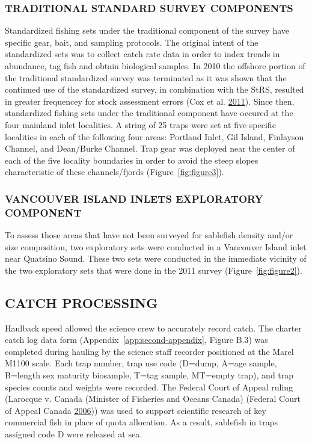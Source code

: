\documentclass[12pt]{article}\usepackage[]{graphicx}\usepackage[]{color}
\begin{document}
\hypertarget{traditional-standard-survey-components}{%
\subsubsection{TRADITIONAL STANDARD SURVEY COMPONENTS}\label{traditional-standard-survey-components}}

Standardized fishing sets under the traditional component of the survey have specific gear, bait, and sampling protocols. The original intent of the standardized sets was to collect catch rate data in order to index trends in abundance, tag fish and obtain biological samples. In 2010 the offshore portion of the traditional standardized survey was terminated as it was shown that the continued use of the standardized survey, in combination with the StRS, resulted in greater frequencey for stock assessment errors (Cox et al. \protect\hyperlink{ref-Cox2011}{2011}). Since then, standardized fishing sets under the traditional component have occured at the four mainland inlet localities. A string of 25 traps were set at five specific localities in each of the following four areas: Portland Inlet, Gil Island, Finlayson Channel, and Dean/Burke Channel. Trap gear was deployed near the center of each of the five locality boundaries in order to avoid the steep slopes characteristic of these channels/fjords (Figure~\ref{fig:figure3}).

\hypertarget{vancouver-island-inlets-exploratory-component}{%
\subsubsection{VANCOUVER ISLAND INLETS EXPLORATORY COMPONENT}\label{vancouver-island-inlets-exploratory-component}}

To assess those areas that have not been surveyed for sablefish density and/or size composition, two exploratory sets were conducted in a Vancouver Island inlet near Quatsino Sound. These two sets were conducted in the immediate vicinity of the two exploratory sets that were done in the 2011 survey (Figure~\ref{fig:figure2}).

\hypertarget{catch-processing}{%
\subsection{CATCH PROCESSING}\label{catch-processing}}

Haulback speed allowed the science crew to accurately record catch. The charter catch log data form (Appendix~\ref{app:second-appendix}, Figure B.3) was completed during hauling by the science staff recorder positioned at the Marel M1100 scale. Each trap number, trap use code (D=dump, A=age sample, B=length sex maturity biosample, T=tag sample, MT=empty trap), and trap species counts and weights were recorded. The Federal Court of Appeal ruling (Larocque v. Canada (Minister of Fisheries and Oceans Canada) (Federal Court of Appeal Canada \protect\hyperlink{ref-Larocque2006}{2006})) was used to support scientific research of key commercial fish in place of quota allocation. As a result, sablefish in traps assigned code D were released at sea.
\end{document}
